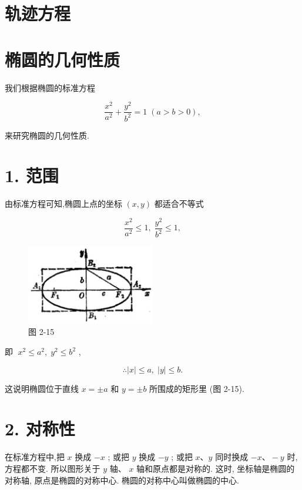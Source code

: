 \documentclass[lang=cn,newtx,10.5pt,scheme=chinese]{elegantbook}
\begin{document}
\section*{轨迹方程}

\section{椭圆的几何性质}

我们根据椭圆的标准方程

\[
  \frac{{x}^{2}}{{a}^{2}} + \frac{{y}^{2}}{{b}^{2}} = 1\;\left( {a > b > 0}\right) ,
\]

来研究椭圆的几何性质.

\section*{1. 范围}

由标准方程可知,椭圆上点的坐标 \(\left( {x,y}\right)\) 都适合不等式

\[
  \frac{{x}^{2}}{{a}^{2}} \leq 1,\;\frac{{y}^{2}}{{b}^{2}} \leq 1,
\]

\begin{figure}[h]
  \centering
  \includegraphics[max width=0.5\textwidth]{images/01912cc2-ffb6-728e-9ae7-b113ff05c64b_90_426128.jpg}
  \caption{图 2-15}
\end{figure}



即 \(\;{x}^{2} \leq {a}^{2},\;{y}^{2} \leq {b}^{2}\) ,

\[
  \therefore \left| x\right| \leq a,\;\left| y\right| \leq b\text{.}
\]

这说明椭圆位于直线 \(x = \pm a\) 和 \(y = \pm b\) 所围成的矩形里 (图 2-15).

\section*{2. 对称性}

在标准方程中,把 \(x\) 换成 \(- x\) ; 或把 \(y\) 换成 \(- y\) ; 或把 \(x\text{、}y\) 同时换成 \(- x\text{、} - y\) 时,方程都不变. 所以图形关于 \(y\) 轴、 \(x\) 轴和原点都是对称的. 这时, 坐标轴是椭圆的对称轴, 原点是椭圆的对称中心. 椭圆的对称中心叫做椭圆的中心.
\end{document}
